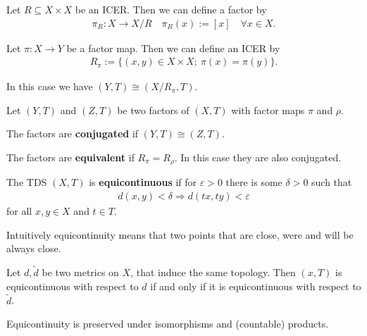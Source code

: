 \begin{frame}
	\begin{proposition}
		Let $R \subseteq X \times X$ be an ICER. Then we can define a factor by
		\begin{align*}
			\pi_R: X \to X/R \quad \pi_R(x) := [x] \quad \forall x \in X.
		\end{align*}
	
		Let $\pi: X \to Y$ be a factor map. Then we can define an ICER by
		\begin{align*}
			R_\pi := \{(x, y) \in X \times X;\ \pi(x) = \pi(y)\}.
		\end{align*}
	
		In this case we have $(Y, T) \cong (X/R_\pi, T)$.
	\end{proposition}
	\begin{definition}
		Let $(Y, T)$ and $(Z, T)$ be two factors of $(X, T)$ with factor maps $\pi$ and $\rho$.
		
		The factors are \textbf{conjugated} if $(Y, T) \cong (Z, T)$.
		
		The factors are \textbf{equivalent} if $R_\pi = R_\rho$. In this case they are also conjugated.
	\end{definition}
\end{frame}

\begin{frame}
	\begin{definition}
		The TDS $(X, T)$ is \textbf{equicontinuous} if for $\varepsilon > 0$ there is some $\delta > 0$ such that
		\begin{align*}
			d(x, y) < \delta \Rightarrow d(tx, ty) < \varepsilon
		\end{align*}
		for all $x, y \in X$ and $t \in T$.
	\end{definition}
	\begin{remark}
		Intuitively equicontinuity means that two points that are close, were and will be always close.
	\end{remark}
	\begin{proposition}
		Let $d, \tilde{d}$ be two metrics on $X$, that induce the same topology. Then $(x, T)$ is equicontinuous with respect to $d$ if and only if it is equicontinuous with respect to $\tilde{d}$.
	\end{proposition}
	\begin{proposition}
		Equicontinuity is preserved under isomorphisms and (countable) products. 
	\end{proposition}
\end{frame}

